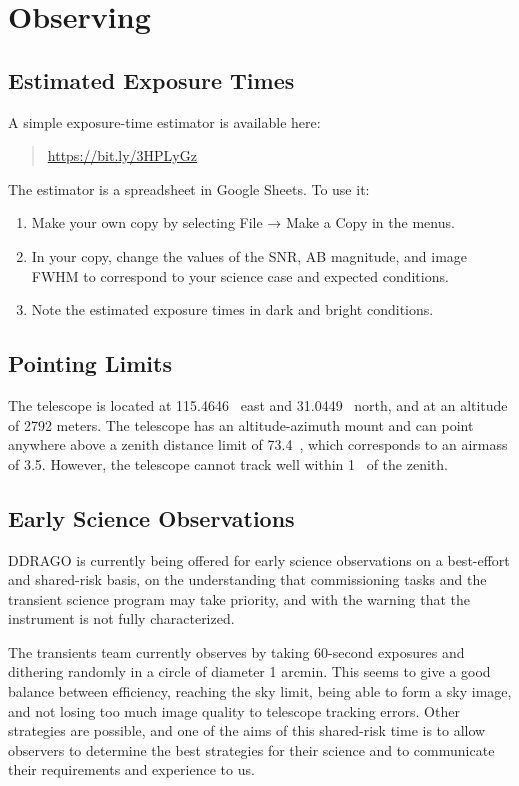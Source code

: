 \chapter{Observing}

\section{Estimated Exposure Times}

A simple exposure-time estimator is available here:

\begin{quote}
\url{https://bit.ly/3HPLyGz}
\end{quote}

The estimator is a spreadsheet in Google Sheets. To use it:
\begin{enumerate}
\item 
Make your own copy by selecting File → Make a Copy in the menus.
\item
In your copy, change the values of the SNR, AB magnitude, and image FWHM to correspond to your science case and expected conditions.
\item 
Note the estimated exposure times in dark and bright conditions.
\end{enumerate}

\section{Pointing Limits}

The telescope is located at 115.4646~{\deg} east and 31.0449~{\deg} north, and at an 
altitude of 2792 meters. The telescope has an altitude-azimuth mount and can point anywhere above a zenith distance limit of 73.4~{\deg}, which corresponds to an airmass of 3.5. However, the telescope cannot track well within 1~{\deg} of the zenith.

\section{Early Science Observations}

DDRAGO is currently being offered for early science observations on a best-effort and shared-risk basis, on the understanding that commissioning tasks and the transient science program may take priority, and with the warning that the instrument is not fully characterized. 

The transients team currently observes by taking 60-second exposures and dithering randomly in a circle of diameter 1 arcmin. This seems to give a good balance between efficiency, reaching the sky limit, being able to form a sky image, and not losing too much image quality to telescope tracking errors. Other strategies are possible, and one of the aims of this shared-risk time is to allow observers to determine the best strategies for their science and to communicate their requirements and experience to us.

